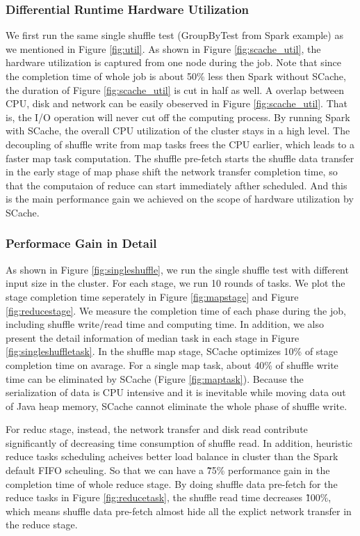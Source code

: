 \subsubsection{Differential Runtime Hardware Utilization} 
We first run the same single shuffle test (GroupByTest from Spark example\cite{sparksource}) as we mentioned in Figure \ref{fig:util}. As shown in Figure \ref{fig:scache_util}, the hardware utilization is captured from one node during the job. Note that since the completion time of whole job is about 50\% less then Spark without SCache, the duration of Figure \ref{fig:scache_util} is cut in half as well. A overlap between CPU, disk and network can be easily obeserved in Figure \ref{fig:scache_util}. That is, the I/O operation will never cut off the computing process. By running Spark with SCache, the overall CPU utilization of the cluster stays in a high level. The decoupling of shuffle write from map tasks frees the CPU earlier, which leads to a faster map task computation. The shuffle pre-fetch starts the shuffle data transfer in the early stage of map phase shift the network transfer completion time, so that the computaion of reduce can start immediately afther scheduled. And this is the main performance gain we achieved on the scope of hardware utilization by SCache.

\subsubsection{Performace Gain in Detail}

As shown in Figure \ref{fig:singleshuffle}, we run the single shuffle test with different input size in the cluster. For each stage, we run 10 rounds of tasks. We plot the stage completion time seperately in Figure \ref{fig:mapstage} and Figure \ref{fig:reducestage}. We measure the completion time of each phase during the job, including shuffle write/read time and computing time. In addition, we also present the detail information of median task in each stage in Figure \ref{fig:singleshuffletask}. In the shuffle map stage, SCache optimizes 10\% of stage completion time on avarage. For a single map task, about 40\% of shuffle write time can be eliminated by SCache (Figure \ref{fig:maptask}). Because the serialization of data is CPU intensive\cite{makingsense} and it is inevitable while moving data out of Java heap memory, SCache cannot eliminate the whole phase of shuffle write. 

For reduc stage, instead, the network transfer and disk read contribute significantly of decreasing time consumption of shuffle read. In addition, heuristic reduce tasks scheduling acheives better load balance in cluster than the Spark default FIFO scheuling. So that we can have a \~75\% performance gain in the completion time of whole reduce stage. By doing shuffle data pre-fetch for the reduce tasks in Figure \ref{fig:reducetask}, the shuffle read time decreases \~100\%, which means shuffle data pre-fetch almost hide all the explict network transfer in the reduce stage.


